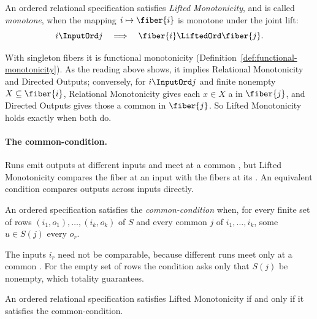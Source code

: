 \begin{definition}
\label{def:lifted-monotonicity}
An ordered relational specification satisfies \emph{Lifted Monotonicity}, and
is called \emph{monotone}, when the mapping $i\mapsto\fiber{i}$ is monotone
under the joint lift:
        \begin{equation}
  i\InputOrd j
  \quad\Longrightarrow\quad
  \fiber{i}\LiftedOrd\fiber{j}.
  \label{eq:lifted-monotonicity}
        \end{equation}
\end{definition}

With singleton fibers it is functional monotonicity
(Definition~\ref{def:functional-monotonicity}).  As the reading above shows,
it implies Relational Monotonicity and Directed Outputs; conversely, for
$i\InputOrd j$ and finite nonempty $X\subseteq\fiber{i}$, Relational
Monotonicity gives each $x\in X$ a \outnoun in $\fiber{j}$, and Directed
Outputs gives those a common \outnoun in $\fiber{j}$.  So Lifted Monotonicity
holds exactly when both do.

\paragraph{The common-\indesc condition.}
Runs emit outputs at different inputs and meet at a common \indesc, but Lifted
Monotonicity compares the fiber at an input with the fibers at its \indescs.  An
equivalent condition compares outputs across inputs directly.

\begin{definition}
\label{def:common-refinement-condition}
An ordered specification satisfies the \emph{common-\indesc condition} when,
for every finite set of rows $(i_1,o_1),\ldots,(i_k,o_k)$ of $S$ and every
common \indesc $j$ of $i_1,\ldots,i_k$, some $u\in S(j)$ \outrel every
$o_r$.
\end{definition}

The inputs $i_r$ need not be comparable, because different runs meet only at a
common \indesc.  For the empty set of rows the condition asks only that
$S(j)$ be nonempty, which totality guarantees.

\begin{proposition}
\label{prop:lifted-monotonicity-decomposition}
An ordered relational specification satisfies Lifted Monotonicity if and only
if it satisfies the common-\indesc condition.
\end{proposition}

